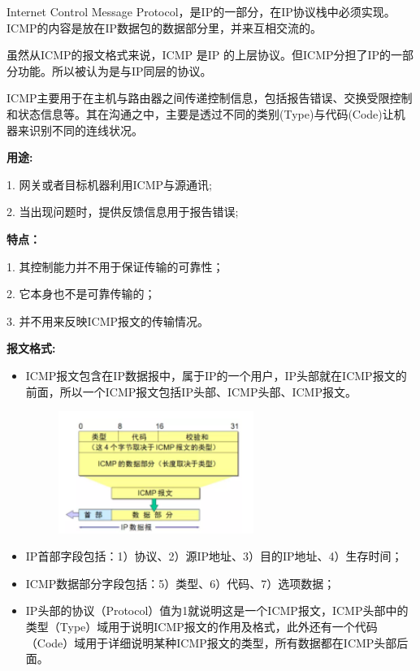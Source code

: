 \documentclass[UTF8]{article}%
\begin{document}
Internet Control Message Protocol，是IP的一部分，在IP协议栈中必须实现。ICMP的内容是放在IP数据包的数据部分里，并来互相交流的。

虽然从ICMP的报文格式来说，ICMP 是IP 的上层协议。但ICMP分担了IP的一部分功能。所以被认为是与IP同层的协议。

ICMP主要用于在主机与路由器之间传递控制信息，包括报告错误、交换受限控制和状态信息等。其在沟通之中，主要是透过不同的类别(Type)与代码(Code)让机器来识别不同的连线状况。

\textbf{用途:}

1. 网关或者目标机器利用ICMP与源通讯;

2. 当出现问题时，提供反馈信息用于报告错误;

\textbf{特点：}

1. 其控制能力并不用于保证传输的可靠性；

2. 它本身也不是可靠传输的；

3. 并不用来反映ICMP报文的传输情况。

\textbf{报文格式:}
\begin{itemize}
    \item ICMP报文包含在IP数据报中，属于IP的一个用户，IP头部就在ICMP报文的前面，所以一个ICMP报文包括IP头部、ICMP头部、ICMP报文。
    
    \begin{figure}[htb!]%
        \includegraphics[width=0.6\textwidth]{1.7-1.png}
    \end{figure}

    \item IP首部字段包括：1）协议、2）源IP地址、3）目的IP地址、4）生存时间；
    \item ICMP数据部分字段包括：5）类型、6）代码、7）选项数据；
    \item IP头部的协议（Protocol）值为1就说明这是一个ICMP报文，ICMP头部中的类型（Type）域用于说明ICMP报文的作用及格式，此外还有一个代码（Code）域用于详细说明某种ICMP报文的类型，所有数据都在ICMP头部后面。
\end{itemize}
\end{document}
